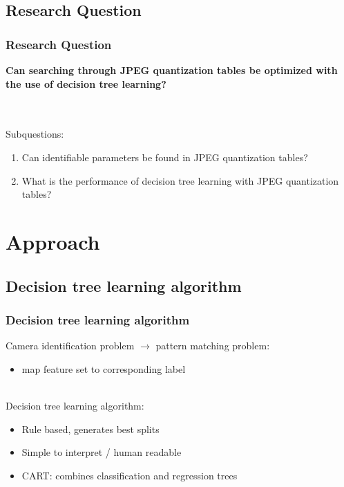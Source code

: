\documentclass{beamer}
\begin{document}
\subsection{Research Question}
\begin{frame}
\frametitle{Research Question}
\begin{center}
\textbf{\Large Can searching through JPEG quantization tables be optimized with the use of decision tree learning?} \\ ~\\
\end{center}
~\\
Subquestions:
\begin{enumerate}
\item Can identifiable parameters be found in JPEG quantization tables?
\item What is the performance of decision tree learning with JPEG quantization tables?
\end{enumerate}
\end{frame}




\section[Approach]{Approach}
\subsection{Decision tree learning algorithm}
\begin{frame}
\frametitle{Decision tree learning algorithm}
Camera identification problem $\rightarrow$ pattern matching problem:\\
\begin{itemize}
\item map feature set to corresponding label
\end{itemize}
~\\
Decision tree learning algorithm:
\begin{itemize}
\item Rule based, generates best splits
\item Simple to interpret / human readable
\item CART: combines classification and regression trees
\end{itemize}
\end{frame}
\end{document}
